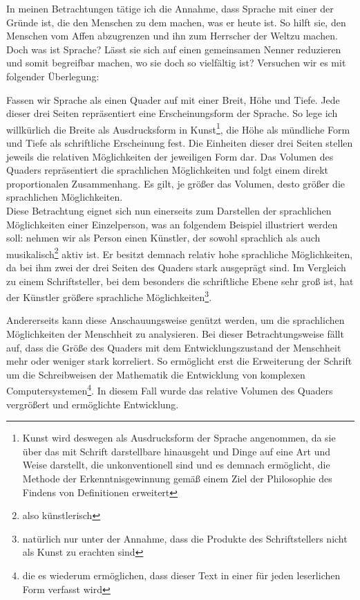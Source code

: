 \documentclass[12pt,a4paper,oneside]{article}
\begin{document}
  In meinen Betrachtungen tätige ich die Annahme, dass Sprache mit einer der Gründe ist, die den Menschen zu dem machen, was er heute ist. So hilft sie, den Menschen vom Affen abzugrenzen und ihn zum \glqq Herrscher der Welt\grqq zu machen. Doch was ist Sprache? Lässt sie sich auf einen gemeinsamen Nenner reduzieren und somit begreifbar machen, wo sie doch so vielfältig ist? Versuchen wir es mit folgender Überlegung:
  
  Fassen wir Sprache als einen Quader auf mit einer Breit, Höhe und Tiefe. Jede dieser drei Seiten repräsentiert eine Erscheinungsform der Sprache. So lege ich willkürlich die Breite als Ausdrucksform in Kunst\footnote{Kunst wird deswegen als Ausdrucksform der Sprache angenommen, da sie über das mit Schrift darstellbare hinausgeht und Dinge auf eine Art und Weise darstellt, die unkonventionell sind und es demnach ermöglicht, die Methode der Erkenntnisgewinnung gemäß einem Ziel der Philosophie des Findens von Definitionen erweitert}, die Höhe als mündliche Form und Tiefe als schriftliche Erscheinung fest. Die Einheiten dieser drei Seiten stellen jeweils die relativen Möglichkeiten der jeweiligen Form dar. Das Volumen des Quaders repräsentiert die sprachlichen Möglichkeiten und folgt einem direkt proportionalen Zusammenhang. Es gilt, je größer das Volumen, desto größer die sprachlichen Möglichkeiten. \\
  
  Diese Betrachtung eignet sich nun einerseits zum Darstellen der sprachlichen Möglichkeiten einer Einzelperson, was an folgendem Beispiel illustriert werden soll: nehmen wir als Person einen Künstler, der sowohl sprachlich als auch musikalisch\footnote{also künstlerisch} aktiv ist. Er besitzt demnach relativ hohe sprachliche Möglichkeiten, da bei ihm zwei der drei Seiten des Quaders stark ausgeprägt sind. Im Vergleich zu einem Schriftsteller, bei dem besonders die schriftliche Ebene sehr groß ist, hat der Künstler größere sprachliche Möglichkeiten\footnote{natürlich nur unter der Annahme, dass die Produkte des Schriftstellers nicht als Kunst zu erachten sind}.
  
  Andererseits kann diese Anschauungsweise genützt werden, um die sprachlichen Möglichkeiten der Menschheit zu analysieren. Bei dieser Betrachtungsweise fällt auf, dass die Größe des Quaders mit dem Entwicklungszustand der Menschheit mehr oder weniger stark korreliert. So ermöglicht erst die Erweiterung der Schrift um die Schreibweisen der Mathematik die Entwicklung von komplexen Computersystemen\footnote{die es wiederum ermöglichen, dass dieser Text in einer für jeden leserlichen Form verfasst wird}. In diesem Fall wurde das relative Volumen des Quaders vergrößert und ermöglichte Entwicklung.\\
  
\end{document}
